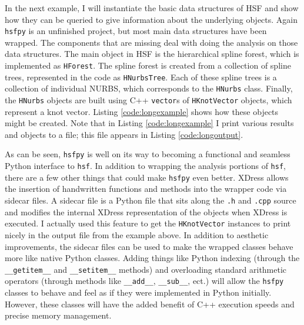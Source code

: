   In the next example, I will instantiate the basic data structures of HSF and show how they can be queried to give information about the underlying objects. Again \texttt{hsfpy} is an unfinished project, but most main data structures have been wrapped. The components that are missing deal with doing the analysis on those data structures. The main object in HSF is the hierarchical spline forest, which is implemented as \texttt{HForest}. The spline forest is created from a collection of spline trees, represented in the code as \texttt{HNurbsTree}. Each of these spline trees is a collection of individual NURBS, which corresponds to the \texttt{HNurbs} class. Finally, the \texttt{HNurbs} objects are built using C++ \texttt{vector}s of \texttt{HKnotVector} objects, which represent a knot vector. Listing \ref{code:longexample} shows how these objects might be created. Note that in Listing \ref{code:longexample} I print various results and objects to a file; this file appears in Listing \ref{code:longoutput}.
  \vspace{.2in}
  
  \mainstretch{}

  \vspace{.2in}
  
  \mainstretch{}

  As can be seen, \texttt{hsfpy} is well on its way to becoming a functional and seamless Python interface to \texttt{hsf}. In addition to wrapping the analysis portions of \texttt{hsf}, there are a few other things that could make \texttt{hsfpy} even better.  XDress allows the insertion of handwritten functions and methods into the wrapper code via sidecar files. A sidecar file is a Python file that sits along the \texttt{.h} and \texttt{.cpp} source and modifies the internal XDress representation of the objects when XDress is executed. I actually used this feature to get the \texttt{HKnotVector} instances to print nicely in the output file from the example above. In addition to aesthetic improvements, the sidecar files can be used to make the wrapped classes behave more like native Python classes. Adding things like Python indexing (through the \texttt{\_\_getitem\_\_} and \texttt{\_\_setitem\_\_} methods) and overloading standard arithmetic operators (through methods like \texttt{\_\_add\_\_}, \texttt{\_\_sub\_\_}, ect.) will allow the \texttt{hsfpy} classes to behave and feel as if they were implemented in Python initially. However, these classes will have the added benefit of C++ execution speeds and precise memory management.

